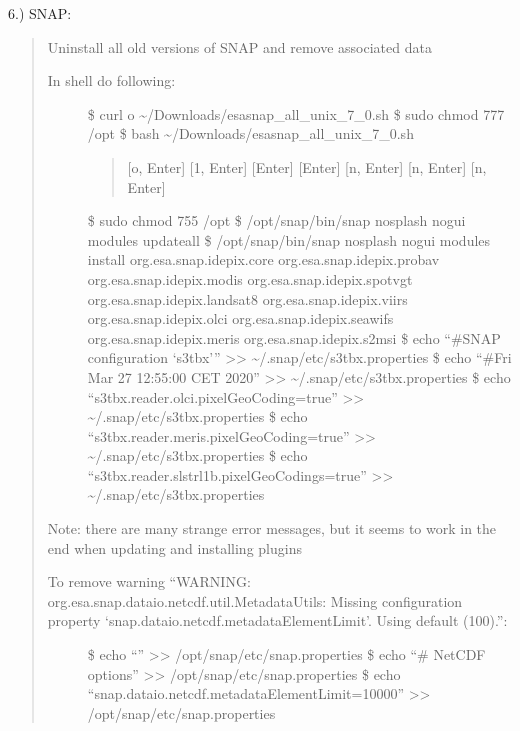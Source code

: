 \documentclass[letterpaper,10pt,english]{sphinxmanual}
\begin{document}
6.) SNAP: 
\begin{quote}

Uninstall all old versions of SNAP and remove associated data
\begin{description}
\item[{In shell do following:}] \leavevmode
\$ curl  \sphinxhyphen{}o \textasciitilde{}/Downloads/esa\sphinxhyphen{}snap\_all\_unix\_7\_0.sh
\$ sudo chmod 777 /opt
\$ bash \textasciitilde{}/Downloads/esa\sphinxhyphen{}snap\_all\_unix\_7\_0.sh
\begin{quote}

{[}o, Enter{]}
{[}1, Enter{]}
{[}Enter{]}
{[}Enter{]}
{[}n, Enter{]}
{[}n, Enter{]}
{[}n, Enter{]}
\end{quote}

\$ sudo chmod 755 /opt
\$ /opt/snap/bin/snap \textendash{}nosplash \textendash{}nogui \textendash{}modules \textendash{}update\sphinxhyphen{}all
\$ /opt/snap/bin/snap \textendash{}nosplash \textendash{}nogui \textendash{}modules \textendash{}install org.esa.snap.idepix.core org.esa.snap.idepix.probav org.esa.snap.idepix.modis org.esa.snap.idepix.spotvgt org.esa.snap.idepix.landsat8 org.esa.snap.idepix.viirs org.esa.snap.idepix.olci org.esa.snap.idepix.seawifs org.esa.snap.idepix.meris org.esa.snap.idepix.s2msi
\$ echo “\#SNAP configuration ‘s3tbx’” \textgreater{}\textgreater{} \textasciitilde{}/.snap/etc/s3tbx.properties
\$ echo “\#Fri Mar 27 12:55:00 CET 2020” \textgreater{}\textgreater{} \textasciitilde{}/.snap/etc/s3tbx.properties
\$ echo “s3tbx.reader.olci.pixelGeoCoding=true” \textgreater{}\textgreater{} \textasciitilde{}/.snap/etc/s3tbx.properties
\$ echo “s3tbx.reader.meris.pixelGeoCoding=true” \textgreater{}\textgreater{} \textasciitilde{}/.snap/etc/s3tbx.properties
\$ echo “s3tbx.reader.slstrl1b.pixelGeoCodings=true” \textgreater{}\textgreater{} \textasciitilde{}/.snap/etc/s3tbx.properties

\end{description}

Note: there are many strange error messages, but it seems to work in the end when updating and installing plugins
\begin{description}
\item[{To remove warning “WARNING: org.esa.snap.dataio.netcdf.util.MetadataUtils: Missing configuration property ‘snap.dataio.netcdf.metadataElementLimit’. Using default (100).”:}] \leavevmode
\$ echo “” \textgreater{}\textgreater{} /opt/snap/etc/snap.properties
\$ echo “\# NetCDF options” \textgreater{}\textgreater{} /opt/snap/etc/snap.properties
\$ echo “snap.dataio.netcdf.metadataElementLimit=10000” \textgreater{}\textgreater{} /opt/snap/etc/snap.properties


\end{description}
\end{quote}
\end{document}
